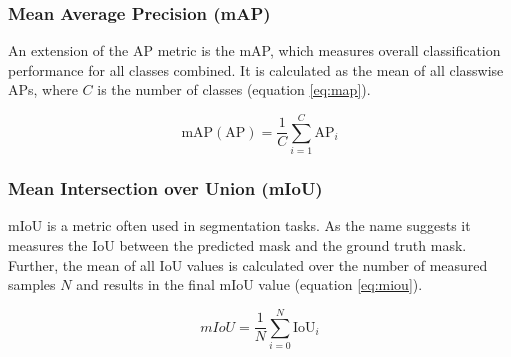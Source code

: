 \subsubsection{Mean Average Precision (mAP)}

An extension of the \ac{AP} metric is the \ac{mAP}, which measures overall classification performance for all classes combined.
It is calculated as the mean of all classwise \acp{AP}, where $C$ is the number of classes (equation \ref{eq:map}).

\begin{equation}
    \text{mAP}(\text{AP}) = \frac{1}{C} \sum_{i=1}^C \text{AP}_i
    \label{eq:map}
\end{equation}

\subsubsection{Mean Intersection over Union (mIoU)}

\ac{mIoU} is a metric often used in segmentation tasks.
As the name suggests it measures the \ac{IoU} between the predicted mask and the ground truth mask.
Further, the mean of all \ac{IoU} values is calculated over the number of measured samples $N$ and results in the final \ac{mIoU} value (equation \ref{eq:miou}).

\begin{equation}
    mIoU = \frac{1}{N} \sum_{i=0}^{N} \text{IoU}_i
    \label{eq:miou}
\end{equation}
